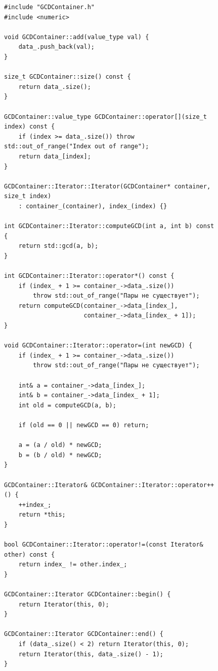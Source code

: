 \documentclass[a4paper, 14pt]{extarticle}
\begin{document}
\begin{figure}[!htb]
\begin{lstlisting}[caption={\texttt{GCDContainer.cpp}},label={lst:gcd-impl}]
#include "GCDContainer.h"
#include <numeric>

void GCDContainer::add(value_type val) {
    data_.push_back(val);
}

size_t GCDContainer::size() const {
    return data_.size();
}

GCDContainer::value_type GCDContainer::operator[](size_t index) const {
    if (index >= data_.size()) throw std::out_of_range("Index out of range");
    return data_[index];
}

GCDContainer::Iterator::Iterator(GCDContainer* container, size_t index)
    : container_(container), index_(index) {}

int GCDContainer::Iterator::computeGCD(int a, int b) const {
    return std::gcd(a, b);
}

int GCDContainer::Iterator::operator*() const {
    if (index_ + 1 >= container_->data_.size())
        throw std::out_of_range("Пары не существует");
    return computeGCD(container_->data_[index_],
                      container_->data_[index_ + 1]);
}

void GCDContainer::Iterator::operator=(int newGCD) {
    if (index_ + 1 >= container_->data_.size())
        throw std::out_of_range("Пары не существует");

    int& a = container_->data_[index_];
    int& b = container_->data_[index_ + 1];
    int old = computeGCD(a, b);

    if (old == 0 || newGCD == 0) return;

    a = (a / old) * newGCD;
    b = (b / old) * newGCD;
}

GCDContainer::Iterator& GCDContainer::Iterator::operator++() {
    ++index_;
    return *this;
}

bool GCDContainer::Iterator::operator!=(const Iterator& other) const {
    return index_ != other.index_;
}

GCDContainer::Iterator GCDContainer::begin() {
    return Iterator(this, 0);
}

GCDContainer::Iterator GCDContainer::end() {
    if (data_.size() < 2) return Iterator(this, 0);
    return Iterator(this, data_.size() - 1);
}
\end{lstlisting}
\end{figure}
\clearpage
\end{document}
